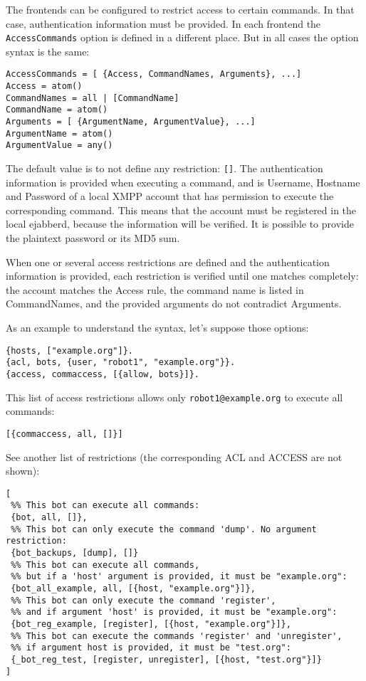 \documentclass[a4paper,10pt]{book}
\newcommand{\term}[1]{\texttt{#1}}
\begin{document}
The frontends can be configured to restrict access to certain commands.
In that case, authentication information must be provided.
In each frontend the \term{AccessCommands} option is defined
in a different place. But in all cases the option syntax is the same:
\begin{verbatim}
AccessCommands = [ {Access, CommandNames, Arguments}, ...]
Access = atom()
CommandNames = all | [CommandName]
CommandName = atom()
Arguments = [ {ArgumentName, ArgumentValue}, ...]
ArgumentName = atom()
ArgumentValue = any()
\end{verbatim}

The default value is to not define any restriction: \term{[]}.
The authentication information is provided when executing a command,
and is Username, Hostname and Password of a local XMPP account
that has permission to execute the corresponding command.
This means that the account must be registered in the local ejabberd,
because the information will be verified.
It is possible to provide the plaintext password or its MD5 sum.

When one or several access restrictions are defined and the
authentication information is provided,
each restriction is verified until one matches completely:
the account matches the Access rule,
the command name is listed in CommandNames,
and the provided arguments do not contradict Arguments.

As an example to understand the syntax, let's suppose those options:
\begin{verbatim}
{hosts, ["example.org"]}.
{acl, bots, {user, "robot1", "example.org"}}.
{access, commaccess, [{allow, bots}]}.
\end{verbatim}

This list of access restrictions allows only \term{robot1@example.org} to execute all commands:
\begin{verbatim}
[{commaccess, all, []}]
\end{verbatim}

See another list of restrictions (the corresponding ACL and ACCESS are not shown):
\begin{verbatim}
[
 %% This bot can execute all commands:
 {bot, all, []},
 %% This bot can only execute the command 'dump'. No argument restriction:
 {bot_backups, [dump], []}
 %% This bot can execute all commands,
 %% but if a 'host' argument is provided, it must be "example.org":
 {bot_all_example, all, [{host, "example.org"}]},
 %% This bot can only execute the command 'register',
 %% and if argument 'host' is provided, it must be "example.org":
 {bot_reg_example, [register], [{host, "example.org"}]},
 %% This bot can execute the commands 'register' and 'unregister',
 %% if argument host is provided, it must be "test.org":
 {_bot_reg_test, [register, unregister], [{host, "test.org"}]}
]
\end{verbatim}
\end{document}
